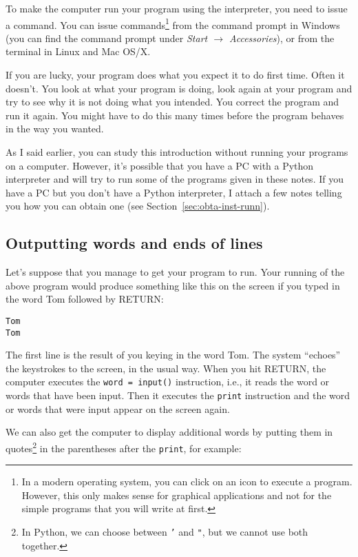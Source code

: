 To make the computer run your program using the interpreter, you need to
issue a command. You can issue commands\footnote{In
    a modern operating system, you can click on an icon to execute a
    program. However, this only makes sense for graphical applications
    and not for the simple programs that you will write at first.}
from the command prompt in Windows (you can find the command prompt under 
\emph{Start $\rightarrow$
    Accessories}), or from the terminal in Linux and Mac OS/X.


If you are lucky, your program does what you expect it 
to do first time.  Often it doesn't.  You look at what your program is
doing, look again at your program and try to see why it is not doing what
you intended.  You correct the program and run it again.
You might have to do this many times before the program behaves in the way
you wanted.

As I said earlier, you can study this introduction without running your
programs on a computer.  However, it's possible that you have a PC with
a Python interpreter and will try to run some of the programs given in these
notes. 
If you have a PC but you don't have a
Python interpreter, I attach a few notes telling
you how you can obtain one (see Section~\ref{sec:obta-inst-runn}).


\subsection{Outputting words and ends of lines}

Let's suppose that you manage to %
get your program to run.
Your running of the above program
would produce something like this on the screen if you typed in
the word Tom followed by RETURN: 

\begin{Verbatim}
Tom
Tom
\end{Verbatim}

The first line is the result of you keying in the word Tom.  The system ``echoes''
the keystrokes to the screen, in the usual way.  When you hit RETURN, the
computer executes the \verb!word = input()! instruction, 
i.e., it reads the word or words that have been input.  Then it
executes the \verb!print! instruction and the word or words that were
input appear on the screen again.

We can also get the computer to display additional words by putting
them in quotes\footnote{In Python, we can choose between \texttt{'} and \texttt{"}, but we cannot use both together.}
in the parentheses after the \verb!print!, for example:

